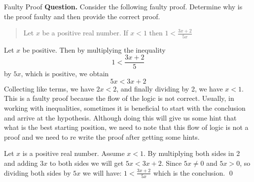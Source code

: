 \begin{example}{Faulty Proof}
	\textbf{Question.} Consider the following faulty proof. Determine why is the proof faulty and then provide the correct proof.
	\begin{quote}
		\centering
		Let $ x $ be a positive real number. If $ x<1 $ then $ 1 < \frac{3x+2}{5x} $
	\end{quote}
	
	 Let $ x $ be positive. Then by multiplying the inequality 
	\[ 1 < \frac{3x+2}{5} \]
	by $ 5x $, which is positive, we obtain
	\[ 5x < 3x + 2 \]
	Collecting like terms, we have $ 2x < 2 $, and finally dividing by 2, we have $ x < 1 $. \\
	
	 This is a faulty proof because the flow of the logic is not correct. Usually, in working with inequalities, sometimes it is beneficial to start with the conclusion and arrive at the hypothesis. Although doing this will give us some hint that what is the best starting position, we need to note that this flow of logic is not a proof and we need to re write the proof after getting some hints.
	
	 Let $ x $ is a positive real number. Assume $ x < 1 $. By multiplying both sides in 2 and adding $ 3x $ to both sides we will get $ 5x < 3x+2 $. Since $ 5x \neq 0 $ and $ 5x > 0 $, so dividing both sides by $ 5x $ we will have: $ 1 < \frac{3x+2}{5x} $ which is the conclusion. \qed
\end{example}











